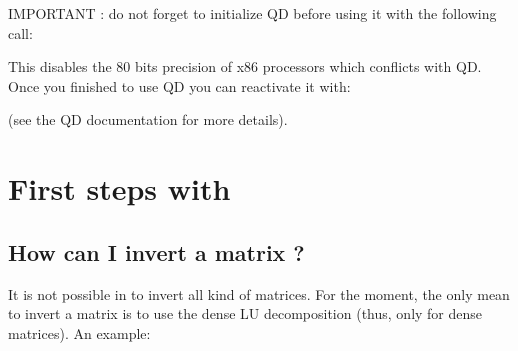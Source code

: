 \documentclass[a4paper,11pt,english]{sphinxmanual}
\begin{document}
IMPORTANT : do not forget to initialize QD before using it with the following call:

\begin{sphinxVerbatim}[commandchars=\\\{\}]
  
\end{sphinxVerbatim}

This disables the 80 bits precision of x86 processors which conflicts with QD. Once you finished to use QD you can reactivate it with:

\begin{sphinxVerbatim}[commandchars=\\\{\}]
\end{sphinxVerbatim}

(see the QD documentation for more details).


\chapter{First steps with }
\label{\detokenize{gmm/first-step:first-steps-with-gmm}}\label{\detokenize{gmm/first-step:gmm-first-step}}\label{\detokenize{gmm/first-step::doc}}

\section{How can I invert a matrix ?}
\label{\detokenize{gmm/first-step:how-can-i-invert-a-matrix}}
It is not possible in  to invert all kind of matrices. For the moment, the only mean to invert a matrix is to use the dense LU decomposition (thus, only for dense matrices). An example:
\end{document}
